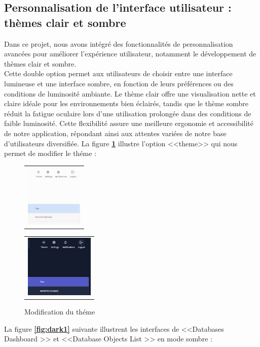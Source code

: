 \subsection{Personnalisation de l'interface utilisateur : thèmes clair et sombre}
\par Dans ce projet, nous avons intégré des fonctionnalités de personnalisation avancées pour améliorer l'expérience utilisateur, notamment le développement de thèmes clair et sombre. \\ Cette double option permet aux 
utilisateurs de choisir entre une interface lumineuse et une interface sombre, en fonction de leurs préférences ou des conditions de luminosité ambiante. Le thème clair offre une visualisation nette et claire idéale
 pour les environnements bien éclairés, tandis que le thème sombre réduit la fatigue oculaire lors d'une utilisation prolongée dans des conditions de faible luminosité. Cette flexibilité assure une meilleure ergonomie 
 et accessibilité de notre application, répondant ainsi aux attentes variées de notre base d'utilisateurs diversifiée.
 La figure \textbf{\ref{fig:theme}} illustre l'option <<theme>> qui nous permet de modifier le théme :
 \begin{figure}[H]
    \centering
    \begin{tabular}[b]{c}
        \includegraphics[width=0.3\linewidth,height=3cm ]{img/captures/dark/5.jpg}
        \end{tabular}
        \begin{tabular}[b]{c}
            \includegraphics[width=0.3\linewidth ,height=3cm]{img/captures/dark/7.jpg}
            \end{tabular}
            \caption{Modification du théme}
            \label{fig:theme}
\end{figure}
\newpage
\par La figure \textbf{\ref{fig:dark1}} suivante illustrent les interfaces de <<Databases Dashboard >> et <<Database Objects List >> en mode sombre :

